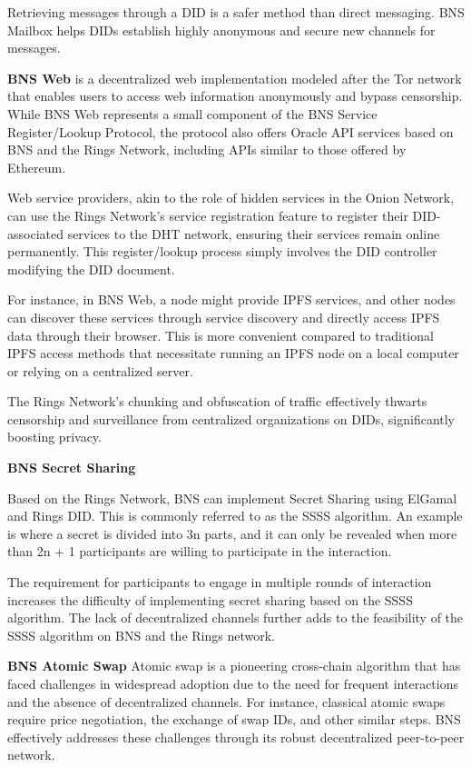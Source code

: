 \documentclass[twocolumn]{article}
\begin{document}
Retrieving messages through a DID is a safer method than direct messaging. BNS Mailbox helps DIDs establish highly anonymous and secure new channels for messages.

\textbf{BNS Web} is a decentralized web implementation modeled after the Tor network that enables users to access web information anonymously and bypass censorship. While BNS Web represents a small component of the BNS Service Register/Lookup Protocol, the protocol also offers Oracle API services based on BNS and the Rings Network, including APIs similar to those offered by Ethereum\cite{Ethereum}.

Web service providers, akin to the role of hidden services in the Onion Network, can use the Rings Network's service registration feature to register their DID-associated services to the DHT network, ensuring their services remain online permanently. This register/lookup process simply involves the DID controller modifying the DID document.

For instance, in BNS Web, a node might provide IPFS\cite{IPFS} services, and other nodes can discover these services through service discovery and directly access IPFS data through their browser. This is more convenient compared to traditional IPFS access methods that necessitate running an IPFS node on a local computer or relying on a centralized server.

The Rings Network's chunking and obfuscation of traffic effectively thwarts censorship and surveillance from centralized organizations on DIDs, significantly boosting privacy.

\textbf{BNS Secret Sharing}

Based on the Rings Network, BNS can implement Secret Sharing using ElGamal\cite{ElGamalEncryption} and Rings DID. This is commonly referred to as the SSSS algorithm. An example is where a secret is divided into 3n parts, and it can only be revealed when more than 2n + 1 participants are willing to participate in the interaction.

The requirement for participants to engage in multiple rounds of interaction increases the difficulty of implementing secret sharing based on the SSSS algorithm. The lack of decentralized channels further adds to the feasibility of the SSSS algorithm on BNS and the Rings network.


\textbf{BNS Atomic Swap} Atomic swap is a pioneering cross-chain algorithm that has faced challenges in widespread adoption due to the need for frequent interactions and the absence of decentralized channels. For instance, classical atomic swaps require price negotiation, the exchange of swap IDs, and other similar steps. BNS effectively addresses these challenges through its robust decentralized peer-to-peer network.
\end{document}
